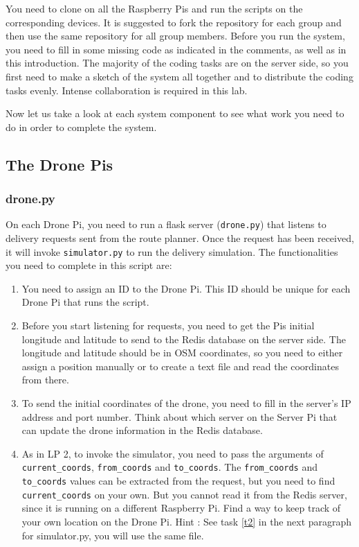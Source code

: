 \documentclass{article}
\begin{document}
You need to clone {} on all the Raspberry Pis and run the scripts on the corresponding devices. It is suggested to fork the repository for each group and then use the same repository for all group members. Before you run the system, you need to fill in some missing code as indicated in the comments, as well as in this introduction. The majority of the coding tasks are on the server side, so you first need to make a sketch of the system all together and to distribute the coding tasks evenly. Intense collaboration is required in this lab.

Now let us take a look at each system component to see what work you need to do in order to complete the system.
\subsection{The Drone Pis}
\subsubsection{drone.py}
On each Drone Pi, you need to run a flask server (\verb!drone.py!) that listens to delivery requests sent from the route planner. Once the request has been received, it will invoke \verb!simulator.py! to run the delivery simulation. The functionalities you need to complete in this script are:
\begin{enumerate}
    \item You need to assign an ID to the Drone Pi. This ID should be unique for each Drone Pi that runs the script.
    \item Before you start listening for requests, you need to get the Pis initial longitude and latitude to send to the Redis database on the server side. The longitude and latitude should be in OSM\cite{OSM} coordinates, so you need to either assign a position manually or to create a text file and read the coordinates from there.
    \item To send the initial coordinates of the drone, you need to fill in the server's IP address and port number. Think about which server on the Server Pi that can update the drone information in the Redis database.
    \item As in LP 2, to invoke the simulator, you need to pass the arguments of \verb!current_coords!, \verb!from_coords! and \verb!to_coords!. The \verb!from_coords! and \verb!to_coords! values can be extracted from the request, but you need to find \verb!current_coords! on your own. But you cannot read it from the Redis server, since it is running on a different Raspberry Pi. Find a way to keep track of your own location on the Drone Pi. Hint : See task \ref{t2} in the next paragraph for simulator.py, you will use the same file.
\end{enumerate}
\end{document}
